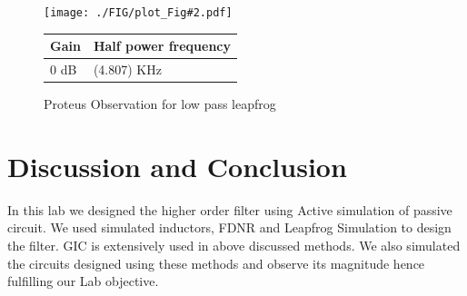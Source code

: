 \documentclass[a4paper,11pt]{article}
\newcommand{\Pobs}[4]{


    \begin{figure}[H]  %
        \centering
        \texttt{[image: ./FIG/plot\_Fig\#2.pdf]}
        \begin{tabular}[H]{| m{14em}| m{22em}|}
            \hline
            \rowcolor[rgb]{0.569,0.647,0.947} \textbf{Gain } & \textbf{Half power frequency} \\ \hline
            #3 dB         & (#4) KHz     \\  \hline
        \end{tabular}
        \caption{Proteus Observation for #2}
    \end{figure}
}
\begin{document}
\Pobs{0.95}{low pass leapfrog}{0}{4.807}


\section{Discussion and Conclusion}
In this lab we designed the higher order filter using Active simulation of passive circuit. We used simulated inductors, FDNR and Leapfrog Simulation to design the filter. GIC is extensively used in above discussed methods.
We also simulated the circuits designed using these methods and observe its magnitude hence fulfilling our Lab objective.
\end{document}
